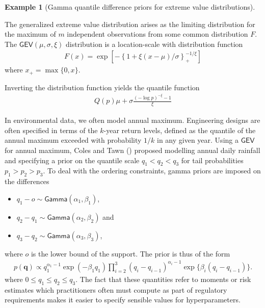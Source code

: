 \documentclass[
  11pt,
  letterpaper,
]{scrbook}
\providecommand{\tightlist}{%
  \setlength{\itemsep}{0pt}\setlength{\parskip}{0pt}}\usepackage{longtable,booktabs,array}
\theoremstyle{definition}
\theoremstyle{plain}
\theoremstyle{plain}
\theoremstyle{definition}
\newtheorem{example}{Example}[chapter]
\theoremstyle{definition}
\theoremstyle{remark}
\begin{document}
\begin{example}[Gamma quantile difference priors for extreme value
distributions]\protect\hypertarget{exm-colestawn}{}\label{exm-colestawn}

The generalized extreme value distribution arises as the limiting
distribution for the maximum of \(m\) independent observations from some
common distribution \(F\). The \(\mathsf{GEV}(\mu, \sigma, \xi)\)
distribution is a location-scale with distribution function
\begin{align*}
F(x) = \exp\left[ - \left\{1+\xi(x-\mu)/\sigma\right\}^{-1/\xi}_{+}\right]
\end{align*} where \(x_{+} = \max\{0, x\}\).

Inverting the distribution function yields the quantile function
\begin{align*}
Q(p) \mu + \sigma \frac{(-\log p)^{-\xi}-1}{\xi}
\end{align*}

In environmental data, we often model annual maximum. Engineering
designs are often specified in terms of the \(k\)-year return levels,
defined as the quantile of the annual maximum exceeded with probability
\(1/k\) in any given year. Using a \(\mathsf{GEV}\) for annual maximum,
Coles and Tawn () proposed modelling
annual daily rainfall and specifying a prior on the quantile scale
\(q_1 < q_2 < q_3\) for tail probabilities \(p_1> p_2 > p_3\). To deal
with the ordering constraints, gamma priors are imposed on the
differences

\begin{itemize}
\tightlist
\item
  \(q_1 - o \sim \mathsf{Gamma}(\alpha_1, \beta_1)\),
\item
  \(q_2 - q_1 \sim \mathsf{Gamma}(\alpha_2, \beta_2)\) and
\item
  \(q_3-q_2 \sim \mathsf{Gamma}(\alpha_3, \beta_3)\),
\end{itemize}

where \(o\) is the lower bound of the support. The prior is thus of the
form \begin{align*}
p(\boldsymbol{q}) \propto q_1^{\alpha_1-1}\exp(-\beta_1 q_1) \prod_{i=2}^3 (q_i-q_{i-1})^{\alpha_i-1} \exp\{\beta_i(q_i-q_{i-1})\}.
\end{align*} where \(0 \leq q_1 \leq q_2 \leq q_3\). The fact that these
quantities refer to moments or risk estimates which practitioners often
must compute as part of regulatory requirements makes it easier to
specify sensible values for hyperparameters.

\end{example}
\end{document}
